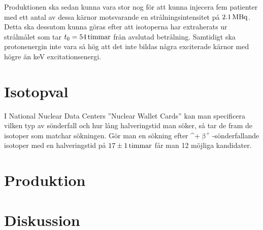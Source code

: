 \documentclass[11pt,a4paper, german, english, swedish
]{article}
\newcommand{\BP}{\ifmmode\upbeta^{+}\else$\upbeta^{+}$\fi}
\begin{document}
Produktionen ska sedan kunna vara stor nog för att kunna injecera fem patienter med ett antal av dessa kärnor motsvarande en strålningsintensitet på $\unit[2.1]{MBq}$. Detta ska dessutom kunna göras efter att isotoperna har extraherats ur strålmålet som tar $t_0=\unit[54]{timmar}$ från avslutad betrålning. Samtidigt ska protonenergin inte vara så hög att det inte bildas några exciterade kärnor med högre än \unit[200]{keV} excitationsenergi. 



\section{Isotopval}
I National Nuclear Data Centers ''Nuclear Wallet Cards''\cite{NNDC_wallet} kan man specificera vilken typ av sönderfall och hur lång halveringstid man söker, så tar de fram de isotoper som matchar sökningen. Gör man en sökning efter \BP-sönderfallande isotoper med en halveringstid på $\unit[17\pm 1]{timmar}$ får man 12 möjliga kandidater. 


\section{Produktion}


\section{Diskussion}



\newpage

\end{document}
